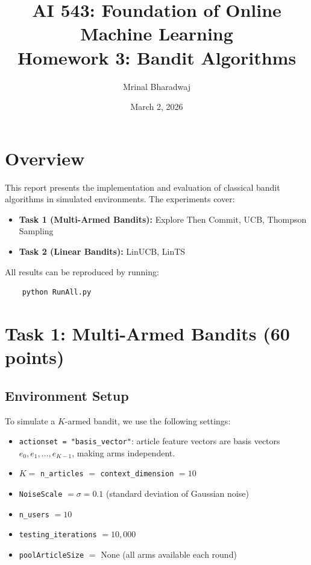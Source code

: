 \documentclass[11pt]{article}
\title{\textbf{AI 543: Foundation of Online Machine Learning} \\ \textbf{Homework 3: Bandit Algorithms}}
\author{Mrinal Bharadwaj}
\date{March 2, 2026}
\begin{document}
\maketitle

\section{Overview}

This report presents the implementation and evaluation of classical bandit algorithms in simulated environments. The experiments cover:
\begin{itemize}[noitemsep]
    \item \textbf{Task 1 (Multi-Armed Bandits):} Explore Then Commit, UCB, Thompson Sampling
    \item \textbf{Task 2 (Linear Bandits):} LinUCB, LinTS
\end{itemize}

\noindent All results can be reproduced by running:
\begin{verbatim}
    python RunAll.py
\end{verbatim}

\section{Task 1: Multi-Armed Bandits (60 points)}

\subsection{Environment Setup}

To simulate a $K$-armed bandit, we use the following settings:
\begin{itemize}[noitemsep]
    \item \texttt{actionset = "basis\_vector"}: article feature vectors are basis vectors $e_0, e_1, \ldots, e_{K-1}$, making arms independent.
    \item $K = $ \texttt{n\_articles} $ = $ \texttt{context\_dimension} $ = 10$
    \item \texttt{NoiseScale} $= \sigma = 0.1$ (standard deviation of Gaussian noise)
    \item \texttt{n\_users} $= 10$
    \item \texttt{testing\_iterations} $= 10{,}000$
    \item \texttt{poolArticleSize} $=$ None (all arms available each round)
\end{itemize}
\end{document}
